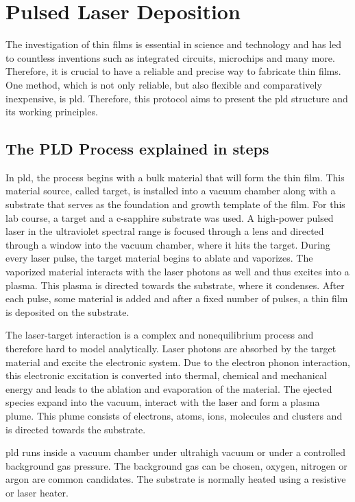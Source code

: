 \section{Pulsed Laser Deposition}
The investigation of thin films is essential in science and 
technology and has led to countless inventions such as integrated circuits, 
microchips and many more. 
Therefore, it is crucial to have a reliable and precise way to fabricate thin films. 
One method, which is not only reliable, but also flexible and comparatively inexpensive,
is \ac{pld}. 
Therefore, this protocol aims to present the \ac{pld} structure and its working
principles.

\subsection{The PLD Process explained in steps}
In \ac{pld}, the process begins with a bulk material that will form the thin film.
This material source, called target, is installed into a vacuum chamber along with a 
substrate that serves as the foundation and growth template of the film.
For this lab course, a  target and a c-sapphire substrate was used.
A high-power pulsed laser in the ultraviolet spectral range is focused through a lens 
and directed through a window into the vacuum chamber, where it hits the target. 
During every laser pulse, the target material begins to ablate and vaporizes. 
The vaporized material interacts with the laser photons as well and thus excites into a 
plasma. 
This plasma is directed towards the substrate, where it condenses.
After each pulse, some material is added and after a fixed number of pulses,
a thin film is deposited on the substrate. 

The laser-target interaction is a complex and nonequilibrium process and therefore
hard to model analytically.
Laser photons are absorbed by the target material and excite the electronic system.
Due to the electron phonon interaction, this electronic excitation is converted 
into thermal, chemical and mechanical energy and leads to the ablation and evaporation
of the material.
The ejected species expand into the vacuum, interact with the laser and form a plasma
plume. 
This plume consists of electrons, atoms, ions, molecules and clusters and is directed 
towards the substrate.

\Ac{pld} runs inside a vacuum chamber under ultrahigh vacuum or under a controlled 
background gas pressure.
The background gas can be chosen, oxygen, nitrogen or argon are common candidates.
The substrate is normally heated using a resistive or laser heater.


